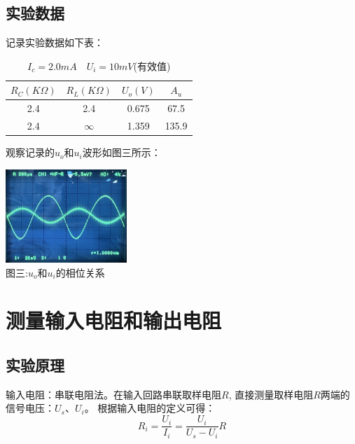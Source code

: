 \documentclass[a4paper]{article}
\begin{document}
    \subsection{实验数据}\label{subsec:7}
    {{记录实验数据如下表：}}
    \begin{table}[htbp]
        \centering
        \caption{$I_c=2.0mA\quad U_i=10mV$(有效值)}
        \begin{tabular}{|c|c|c|c|}
            \hline
            $R_C(K\Omega)$ & $R_L(K\Omega)$ & $U_o(V)$ & $A_u$ \\
            \hline
            2.4            & 2.4            & 0.675    & 67.5  \\
            \hline
            2.4            & $\infty$       & 1.359    & 135.9 \\
            \hline
        \end{tabular}\label{tab:table3}
    \end{table}

    {{观察记录的$u_o$和$u_i$波形如图三所示：}}

    \begin{center}
        \includegraphics[height=100pt]{ref}\\
        {\small 图三:$u_o$和$u_i$的相位关系}
    \end{center}

    \vspace{1cm}


    \section{测量输入电阻和输出电阻}\label{sec:5}

    \subsection{实验原理}\label{subsec:9}
    {{输入电阻：串联电阻法。在输入回路串联取样电阻$R$,
    直接测量取样电阻$R$两端的信号电压：$U_s$、$U_i$。
    根据输入电阻的定义可得：}}
    \begin{equation}
        R_i=\frac{U_i}{I_i}=\frac{U_i}{U_s-U_i}R\label{eq:equation4}
    \end{equation}
\end{document}
